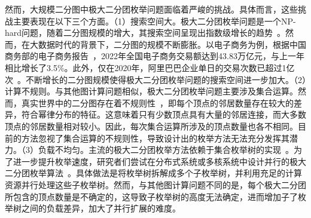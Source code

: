 然而，大规模二分图中极大二分团枚举问题面临着严峻的挑战。具体而言，这些挑战主要表现在以下三个方面。（1）搜索空间大。极大二分团枚举问题是一个NP-hard问题，随着二分图规模的增大，其搜索空间呈现出指数级增长的趋势~\cite{MICA04}。然而，在大数据时代的背景下，二分图的规模不断膨胀。以电子商务为例，根据中国商务部的电子商务报告~\cite{ECommerceReport}，2022年全国电子商务交易额达到43.83万亿元，与上一年相比增长了3.5\%。此外，仅在2020年，阿里巴巴企业单日的交易次数已超过1亿次~\cite{MEB20}。不断增长的二分图规模使得极大二分团枚举问题的搜索空间进一步加大。（2）计算不规则。与其他图计算问题相似，极大二分团枚举问题主要涉及集合运算。然而，真实世界中的二分图存在着不规则性~\cite{Irregularity12}，即每个顶点的邻居数量存在较大的差异，符合幂律分布的特征。这意味着只有少数顶点具有大量的邻居连接，而大多数顶点的邻居数量相对较小。因此，每次集合运算所涉及的顶点数量也各不相同。目前的方法忽视了集合运算的不规则性，导致设计出的枚举方法无法充分发挥其潜力。（3）负载不均匀。主流的极大二分团枚举方法依赖于集合枚举树的实现~\cite{minel06,iMBEA14,PMBE20,ooMBE22}。为了进一步提升枚举速度，研究者们尝试在分布式系统或多核系统中设计并行的极大二分团枚举算法~\cite{mapreduceMBE16,parMBE18}。具体做法是将枚举树拆解成多个子枚举树，并利用充足的计算资源并行处理这些子枚举树。然而，与其他图计算问题不同的是，每个极大二分团所包含的顶点数量是不确定的，这导致子枚举树的高度无法确定，进而增加子了枚举树之间的负载差异，加大了并行扩展的难度。





